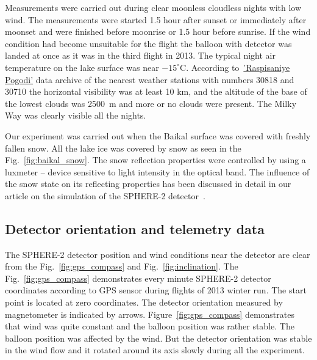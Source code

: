\documentclass[final,5p,times,twocolumn]{elsarticle}
\begin{document}
Measurements were carried out during clear moonless cloudless nights with low wind. The measurements were started 1.5 hour after sunset or immediately after moonset and were finished before moonrise or 1.5 hour before sunrise. If the wind condition had become unsuitable for the flight the balloon with detector was landed at once as it was in the third flight in 2013. The typical night air temperature on the lake surface was near $-15^\circ$C. According to~\href{https://rp5.ru/}{'Raspisaniye Pogodi'} data archive of the nearest weather stations with numbers 30818 and 30710 the horizontal visibility was at least 10 km, and the altitude of the base of the lowest clouds was 2500~m and more or no clouds were present. The Milky Way was clearly visible all the nights.

Our experiment was carried out when the Baikal surface was covered with freshly fallen snow. All the lake ice was covered by snow as seen in the Fig.~\ref{fig:baikal_snow}.  The snow reflection properties were controlled by using a luxmeter -- device sensitive to light intensity in the optical band. The influence of the snow state on its reflecting properties has been discussed in detail in our article on the simulation of the SPHERE-2 detector~\cite{Ant19}. 


\subsection{Detector orientation and telemetry data\label{sect:telemetrydata}}

The \mbox{SPHERE-2} detector position and wind conditions near the detector are clear from the Fig.~\ref{fig:gps_compass} and Fig.~\ref{fig:inclination}. The Fig.~\ref{fig:gps_compass} demonstrates every minute \mbox{SPHERE-2} detector coordinates according to GPS sensor during flights of 2013 winter run. The start point is located at zero coordinates. The detector orientation measured by magnetometer is indicated by arrows. Figure~\ref{fig:gps_compass} demonstrates that wind was quite constant and the balloon position was rather stable. The balloon position was affected by the wind. But the detector orientation was stable in the wind flow and it rotated around its axis slowly during all the experiment.  
\end{document}
